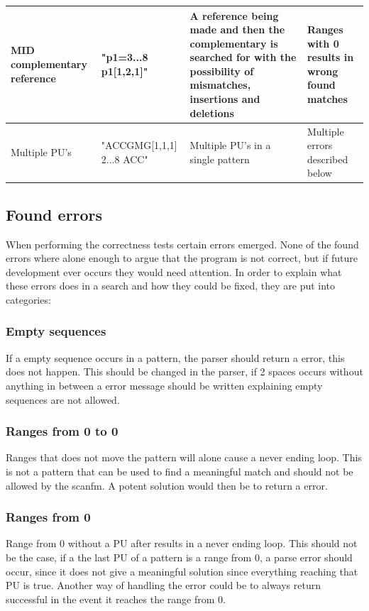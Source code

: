 \documentclass[12pt]{article}
\newcommand{\textapprox}{\raisebox{0.5ex}{\texttildelow}}
\newcommand{\pu}{PU }
\newcommand{\pus}{PU's }
\begin{document}
\begin{table}[H]
\begin{tabular}{p{2cm}|p{3cm}|p{5cm}|p{4.5cm}}
MID complementary reference & "p1=3...8 \textapprox p1[1,2,1]" & A reference being made and then the complementary is searched for with the possibility of mismatches, insertions and deletions & Ranges with 0 results in wrong found matches\\ \hline

Multiple \pus & "ACCGMG[1,1,1] 2...8 ACC" & Multiple \pus in a single pattern & Multiple errors described below

\end{tabular}
\end{table}
\subsection{Found errors}
When performing the correctness tests certain errors emerged. None of the found errors where alone
enough to argue that the program is not correct, but if future development ever occurs they would
need attention.
In order to explain what these errors does in a search and how they could be fixed, they are put into
categories:

\subsubsection{Empty sequences}
If a empty sequence occurs in a pattern, the parser should return a error, this does not happen.
This should be changed in the parser, if 2 spaces occurs without anything in between a error message
should be written explaining empty sequences are not allowed.

\subsubsection{Ranges from 0 to 0}
Ranges that does not move the pattern will alone cause a never ending loop. This is not a 
pattern that can be used to find a meaningful match and should not be allowed by the scanfm.
A potent solution would then be to return a error.

\subsubsection{Ranges from 0}
Range from 0 without a \pu after results in a never ending loop. This should not be the case, if a the last
\pu of a pattern is a range from 0, a parse error should occur, since it does not give a meaningful solution
since everything reaching that \pu is true. Another way of handling the error could be to always return successful in the event it reaches the range from 0.
\end{document}
